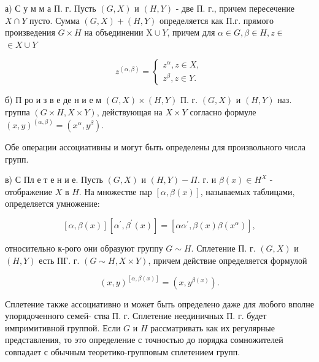 \documentclass[10pt]{article}
\begin{document}
а) С у м м а П. г. Пусть $(G, X)$ и $(H, Y)$ - две П. г., причем пересечение $X \cap Y$ пусто. Сумма $(G, X)+(H, Y)$ определяется как П.г. прямого произведения $G \times H$ на объединении $\mathrm{X} \cup Y$, причем для $\alpha \in G, \beta \in H, z \in$ $\in X \cup Y$



\[

z^{(\alpha, \beta)}=\left\{\begin{array}{l}

z^{\alpha}, z \in X, \\

z^{\beta}, z \in Y .

\end{array}\right.

\]



б) П ро и з в е де н и е м $(G, X) \times(H, Y)$ П. г. $(G, X)$ и $(H, Y)$ наз. группа $(G \times H, X \times Y)$, действующая на $X \times Y$ согласно формуле $(x, y)^{(\alpha, \beta)}=\left(x^{\alpha}, y^{\beta}\right)$.



Обе операции ассоциативны и могут быть определены для произвольного числа групп.



в) С Пл е т е н и е. Пусть $(G, X)$ и $(H, Y)-\Pi$. г. и $\beta(x) \in H^{X}$ - отображение $X$ в $H$. На множестве пар $[\alpha, \beta(x)]$, называемых таблицами, определяется умножение:



\[

[\alpha, \beta(x)]\left[\alpha^{\prime}, \beta^{\prime}(x)\right]=\left[\alpha \alpha^{\prime}, \beta(x) \beta\left(x^{\alpha}\right)\right],

\]



относительно к-рого они образуют группу $G \sim H$. Сплетение П. г. $(G, X)$ и $(H, Y)$ есть ПГ. г. $(G \sim H, X \times Y)$, причем действие определяется формулой



\[

(x, y)^{[\alpha, \beta(x)]}=\left(x, y^{\beta(x)}\right) .

\]



Сплетение также ассоциативно и может быть определено даже для любого вполне упорядоченного семей- ства П. г. Сплетение неединичных П. г. будет импримитивной группой. Если $G$ и $H$ рассматривать как их регулярные представления, то это определение с точностью до порядка сомножителей совпадает с обычным теоретико-групповым сплетением групп.
\end{document}
